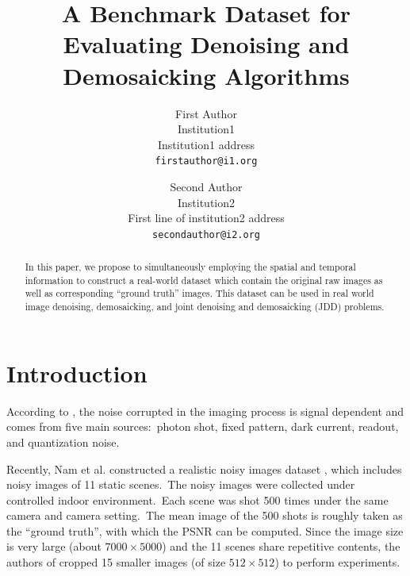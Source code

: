 \documentclass[10pt,twocolumn,letterpaper]{article}
\begin{document}
\title{A Benchmark Dataset for Evaluating Denoising and Demosaicking Algorithms}

\author{First Author\\
Institution1\\
Institution1 address\\
{\tt\small firstauthor@i1.org}
\and
Second Author\\
Institution2\\
First line of institution2 address\\
{\tt\small secondauthor@i2.org}
}

\maketitle


\begin{abstract}
In this paper, we propose to simultaneously employing the spatial and temporal information to construct a real-world dataset which contain the original raw images as well as corresponding ``ground truth'' images. This dataset can be used in real world image denoising, demosaicking, and joint denoising and demosaicking (JDD) problems.
\end{abstract}

\section{Introduction}

According to \cite{healey1994radiometric}, the noise corrupted in the imaging process is signal dependent and comes from five main sources:\ photon shot, fixed pattern, dark current, readout, and quantization noise.

Recently, Nam et al. constructed a realistic noisy images dataset \cite{crosschannel2016}, which includes noisy images of 11 static scenes.\ The noisy images were collected under controlled indoor environment.\ Each scene was shot 500 times under the same camera and camera setting.\ The mean image of the 500 shots is roughly taken as the ``ground truth'', with which the PSNR can be computed. Since the image size is very large (about $7000\times5000$) and the 11 scenes share repetitive contents, the authors of \cite{crosschannel2016} cropped 15 smaller images (of size $512\times512$) to perform experiments.\
\end{document}
